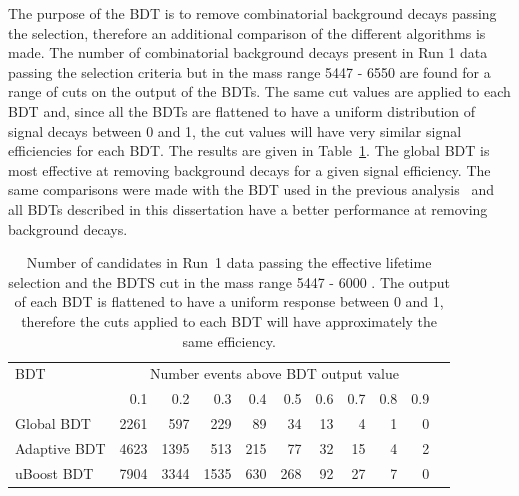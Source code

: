 The purpose of the BDT is to remove combinatorial background decays passing the \bsmumu selection, therefore an additional comparison of the different algorithms is made. The number of combinatorial background decays present in Run 1 data passing the \el selection criteria but in the mass range 5447 - 6550 \mevcc are found for a range of cuts on the output of the BDTs. %
The same cut values are applied to each BDT and, since all the BDTs are flattened to have a uniform distribution of signal decays between 0 and 1, the cut values will have very similar signal efficiencies for each BDT. %
The results are given in Table~\ref{tab:bkgdsC}. The global BDT is most effective at removing background decays for a given signal efficiency.
The same comparisons were made with the BDT used in the previous analysis~\cite{Aaij:2013aka, CMS:2014xfa} and all BDTs described in this dissertation have a better performance at removing background decays. 




\begin{table}[htbp]
\begin{center}
\begin{tabular}{lrrrrrrrrrr}
\toprule \toprule
BDT & \multicolumn{9}{c}{Number events above BDT output value}  \\
\cmidrule{2-10}
   & 0.1 & 0.2 & 0.3 & 0.4 & 0.5 & 0.6 & 0.7 & 0.8 & 0.9 \\ \midrule
Global BDT  & 2261 & 597 & 229 & 89 & 34 & 13 & 4 & 1 & 0 \\ 
Adaptive BDT  & 4623 & 1395 & 513 & 215 & 77 & 32 & 15 & 4 & 2 \\
uBoost BDT & 7904 & 3344 & 1535 &630 & 268 & 92 & 27 & 7 & 0 \\
\bottomrule \bottomrule
\end{tabular}
\vspace{0.7cm}
\vspace{0.7cm}
\caption{Number of candidates in Run~1 data passing the effective lifetime selection and the BDTS cut in the mass range 5447 - 6000 \mevcc. The output of each BDT is flattened to have a uniform response between 0 and 1, therefore the cuts applied to each BDT will have approximately the same efficiency.}
\label{tab:bkgdsC}
\end{center}
\vspace{-1.0cm}
\end{table}


